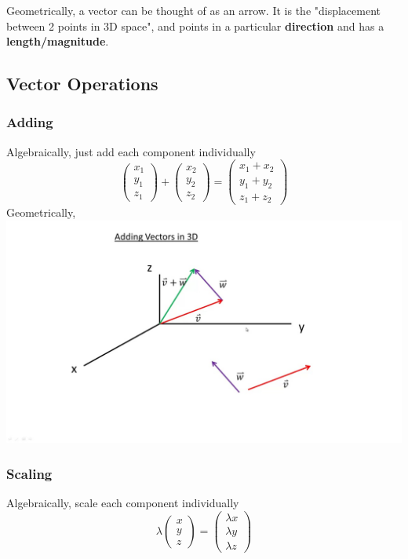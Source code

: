 \documentclass{article}
\begin{document}
Geometrically, a vector can be thought of as an arrow. It is the "displacement between 2 points in 3D space", and points in a particular \textbf{direction} and has a \textbf{length/magnitude}. 

\subsection{Vector Operations}
\subsubsection{Adding}
Algebraically, just add each component individually
$$\left(
    \begin{array}{c}  
         x_1 \\
         y_1 \\
         z_1
    \end{array}
    \right) + \left(
    \begin{array}{c}  
         x_2 \\
         y_2 \\
         z_2
    \end{array}
    \right) = \left(
    \begin{array}{c}  
         x_1 + x_2 \\
         y_1 + y_2 \\
         z_1 + z_2
    \end{array}
    \right) 
$$
Geometrically, \\
\includegraphics[width=\linewidth]{images/addingvectors.jpg}
\subsubsection{Scaling}
Algebraically, scale each component individually
$$
\lambda \left(
    \begin{array}{c}  
         x \\
         y \\
         z
    \end{array}
    \right) = \left(
    \begin{array}{c}  
         \lambda x \\
         \lambda y \\
         \lambda z
    \end{array}
    \right)
$$
\end{document}
